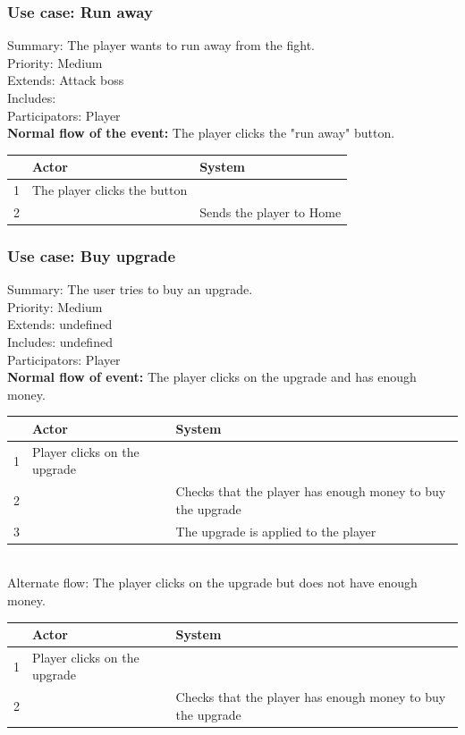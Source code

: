 \documentclass{article}
\begin{document}
\subsubsection{Use case: Run away}
Summary: The player wants to run away from the fight.\\
Priority: Medium \\
Extends: Attack boss\\
Includes:\\
Participators: Player\\
\textbf{Normal flow of the event:} The player clicks the "run away" button.
\vspace{1 mm}\\
\begin{tabular}{|c|l|l|} \hline
    & Actor & System \\ \hline
    1 & The player clicks the button & \\ \hline
    2 & & Sends the player to Home \\ \hline
\end{tabular}

\subsubsection{Use case: Buy upgrade}
Summary: The user tries to buy an upgrade.\\
Priority: Medium\\
Extends: undefined\\
Includes: undefined\\
Participators: Player\\
\textbf{Normal flow of event:} The player clicks on the upgrade and has enough money.
\vspace{1 mm}\\
\begin{tabular}{|c|l|l|} \hline
      & Actor & System \\ \hline
    1 & Player clicks on the upgrade & \\ \hline
    2 & & Checks that the player has enough money to buy the upgrade \\ \hline
    3 & & The upgrade is applied to the player \\ \hline
\end{tabular}
\vspace{5 mm}\\ 
Alternate flow: The player clicks on the upgrade but does not have enough money. 
\vspace{1 mm}\\
\begin{tabular}{|c|l|l|} \hline
      & Actor & System \\ \hline
    1 & Player clicks on the upgrade & \\ \hline
    2 & & Checks that the player has enough money to buy the upgrade \\ \hline
\end{tabular} 
\end{document}
